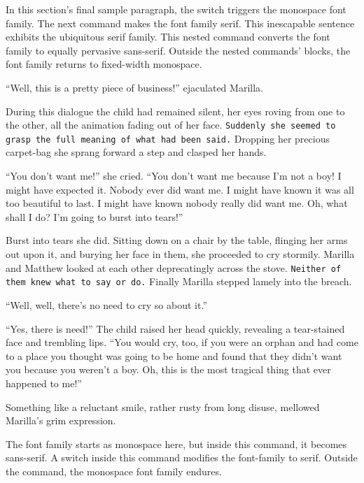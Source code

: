 \documentclass[a4paper]{article}
\begin{document}
In this section's final sample paragraph, \ttfamily the switch triggers the monospace font family. The next command makes the font family serif. \textrm{This inescapable sentence exhibits the ubiquitous serif family. \textsf{This nested command converts the font family to equally pervasive sans-serif.}} Outside the nested commands' blocks, the font family returns to fixed-width monospace.

\sffamily ``Well, this is a pretty piece of business!'' ejaculated Marilla.

\textrm{During this dialogue the child had remained silent, her eyes roving from one to the other, all the animation fading out of her face. \texttt{Suddenly she seemed to grasp the full meaning of what had been said.} Dropping her precious carpet-bag she sprang forward a step and clasped her hands.}

``You don't want me!'' she cried. ``You don't want me because I'm not a boy! I might have expected it. Nobody ever did want me. I might have known it was all too beautiful to last. I might have known nobody really did want me. \rmfamily Oh, what shall I do? I'm going to burst into tears!''

Burst into tears she did. \textsf{Sitting down on a chair by the table, flinging her arms out upon it, and burying her face in them, she proceeded to cry stormily.} Marilla and Matthew looked at each other deprecatingly across the stove. \texttt{Neither of them knew what to say or do.} Finally Marilla stepped lamely into the breach.

``Well, well, there's no need to cry so about it.''

``Yes, there is need!'' \ttfamily The child raised her head quickly, revealing a tear-stained face and trembling lips. \textrm{``You would cry, too, if you were an orphan and had come to a place you thought was going to be home and found that they didn't want you because you weren't a boy. \textsf{Oh, this is the most tragical thing that ever happened to me!''}}

Something like a reluctant smile, rather rusty from long disuse, mellowed Marilla's grim expression.

The font family starts as monospace here, \textsf{but inside this command, it becomes sans-serif. \rmfamily A switch inside this command modifies the font-family to serif.} Outside the command, the monospace font family endures.
\end{document}
